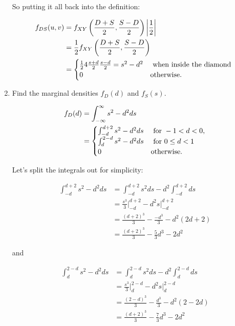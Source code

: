 \documentclass{article}
\newcommand{\1}{\mathbf{1}}
\begin{document}
\begin{enumerate}
    So putting it all back into the definition:
    
    \begin{align*}
     f_{DS}(u,v) &= f_{XY}\left(\frac{D + S}{2}, \frac{S - D}{2}\right) \bigg|\frac{1}{2}\bigg| \\
     &= \frac{1}{2} f_{XY}\left(\frac{D + S}{2}, \frac{S - D}{2}\right) \\
     &= \begin{cases}
        \frac{1}{2} 4\frac{s+d}{2}\frac{s-d}{2} = s^2-d^2 & \hbox{ when inside the diamond } \\ 
        0 & \hbox{otherwise.}
        \end{cases}
    \end{align*}

    \newpage
    \item Find the marginal densities $f_D(d)$ and $f_S(s)$.
    
    \begin{align*}
    f_{D}(d) &= \int_{-\infty}^\infty s^2 - d^2 ds \\
    &= \begin{cases}
       \int_{-d}^{d+2} s^2 - d^2 ds &\hbox{ for } -1 < d < 0, \\
       \int_{d}^{2-d} s^2 - d^2 ds  &\hbox{ for } 0\leq d < 1 \\
       0 &\hbox{otherwise.}
       \end{cases}
    \end{align*}
    
    Let's split the integrals out for simplicity:

    \begin{align*}
        \int_{-d}^{d+2} s^2 - d^2 ds &=  \int_{-d}^{d+2} s^2 ds -  d^2\int_{-d}^{d+2} ds \\
        &= \frac{s^3}{3}\bigg |_{-d}^{d+2} - d^2 s|_{-d}^{d+2} \\
        &= \frac{(d+2)^3}{3} - \frac{-d^3}{3} - d^2(2d+2) \\
        &= \frac{(d+2)^3}{3} - \frac{5}{3} d^3 - 2d^2
    \end{align*}
    
    and
    
    \begin{align*}
        \int_{d}^{2-d} s^2 - d^2 ds &=  \int_{d}^{2-d} s^2 ds -  d^2\int_{d}^{2-d} ds \\
        &= \frac{s^3}{3}\bigg |_{d}^{2-d} - d^2 s|_{d}^{2-d} \\
        &= \frac{(2-d)^3}{3} - \frac{d^3}{3} - d^2(2-2d) \\
        &= \frac{(d+2)^3}{3} - \frac{7}{3} d^3 - 2d^2 
    \end{align*}
    

\end{enumerate}
\end{document}
